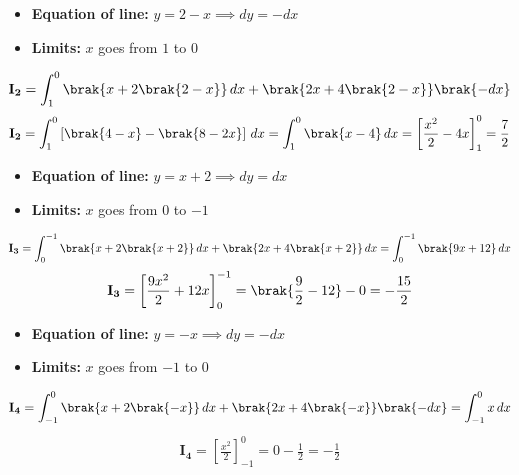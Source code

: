 \begin{enumerate}
\begin{itemize}
    \item \textbf{Equation of line:} $y = 2 - x \implies dy = -dx$
    \item \textbf{Limits:} $x$ goes from $1$ to $0$
\end{itemize}
\begin{align}
\mathbf{I_2} = \int_1^0 \brak{x + 2\brak{2-x}}\,dx + \brak{2x + 4\brak{2-x}}\brak{-dx}
\end{align}
\begin{align}
\mathbf{I_2} = \int_1^0 \left[ \brak{4-x} - \brak{8-2x} \right]\,dx = \int_1^0 \brak{x-4}\,dx = \left[ \frac{x^2}{2} - 4x \right]_1^0 = \frac{7}{2}
\end{align}

\begin{itemize}
    \item \textbf{Equation of line:} $y = x + 2 \implies dy = dx$
    \item \textbf{Limits:} $x$ goes from $0$ to $-1$
\end{itemize}
\begin{align}
\mathbf{I_3} = \int_0^{-1} \brak{x + 2\brak{x+2}}\,dx + \brak{2x + 4\brak{x+2}}\,dx = \int_0^{-1} \brak{9x + 12}\,dx
\end{align}
\begin{align}
\mathbf{I_3} = \left[ \frac{9x^2}{2} + 12x \right]_0^{-1} = \brak{\frac{9}{2} - 12} - 0 = -\frac{15}{2}
\end{align}

\begin{itemize}
    \item \textbf{Equation of line:} $y = -x \implies dy = -dx$
    \item \textbf{Limits:} $x$ goes from $-1$ to $0$
\end{itemize}
\begin{align}
\mathbf{I_4} = \int_{-1}^0 \brak{x + 2\brak{-x}}\,dx + \brak{2x + 4\brak{-x}}\brak{-dx} = \int_{-1}^0 x\,dx
\end{align}
\begin{align}
\mathbf{I_4} = \left[ \frac{x^2}{2} \right]_{-1}^0 = 0 - \frac{1}{2} = -\frac{1}{2}
\end{align}


\end{enumerate}
